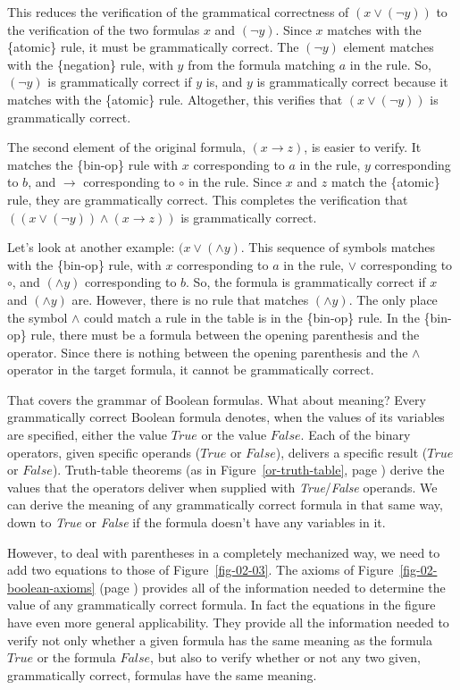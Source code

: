 This reduces the verification of the grammatical correctness of $(x \vee (\neg y))$
to the verification of the two formulas $x$ and $(\neg y)$.
Since $x$ matches with the \{atomic\} rule, it must be grammatically correct.
The $(\neg y)$ element matches with the \{negation\} rule,
with $y$ from the formula matching $a$ in the rule.
So, $(\neg y)$ is grammatically correct if $y$ is,
and $y$ is grammatically correct because it matches with the \{atomic\} rule.
Altogether, this verifies that $(x \vee (\neg y))$ is grammatically correct.

The second element of the original formula,
$(x \rightarrow z)$, is easier to verify.
It matches the \{bin-op\} rule with $x$ corresponding to $a$ in the rule,
$y$ corresponding to $b$, and $\rightarrow$ corresponding to $\circ$ in the rule.
Since $x$ and $z$ match the \{atomic\} rule, they are grammatically correct.
This completes the verification that
$((x \vee (\neg y)) \wedge (x \rightarrow z))$
is grammatically correct.

Let's look at another example: $(x \vee (\wedge y)$.
This sequence of symbols matches with the \{bin-op\} rule,
with $x$ corresponding to $a$ in the rule,
$\vee$ corresponding to $\circ$,
and $(\wedge y)$ corresponding to $b$.
So, the formula is grammatically correct
if $x$ and $(\wedge y)$ are.
However, there is no rule that matches $(\wedge y)$.
The only place the symbol $\wedge$ could match a rule
in the table is in the \{bin-op\} rule.
In the \{bin-op\} rule, there must be
a formula between
the opening parenthesis and the operator.
Since there is nothing
between the opening parenthesis
and the $\wedge$ operator in the target formula,
it cannot be grammatically correct.

That covers the grammar of Boolean formulas.
What about meaning?
Every grammatically correct Boolean formula denotes,
when the values of its variables are specified,
either the value $True$ or the value $False$.
Each of the binary operators, given specific operands ($True$ or $False$),
delivers a specific result ($True$ or $False$).
Truth-table theorems
(as in Figure~\ref{or-truth-table}, page \pageref{or-truth-table})
derive the values that the operators deliver when
supplied with \emph{True}/\emph{False} operands.
We can derive the meaning of any grammatically correct formula
in that same way, down to \emph{True} or \emph{False} if the formula
doesn't have any variables in it.

However, to deal with parentheses in a completely mechanized way,
we need to add two equations to those of Figure~\ref{fig-02-03}.
The axioms of Figure~\ref{fig-02-boolean-axioms} (page \pageref{fig-02-boolean-axioms})
provides all of the information needed to determine
the value of any grammatically correct formula.
In fact the equations in the figure have even more general applicability.
They provide all the information needed
to verify not only whether a given formula
has the same meaning as the formula $True$ or the formula $False$,
but also to verify whether or not any two given,
grammatically correct, formulas have the same meaning.

